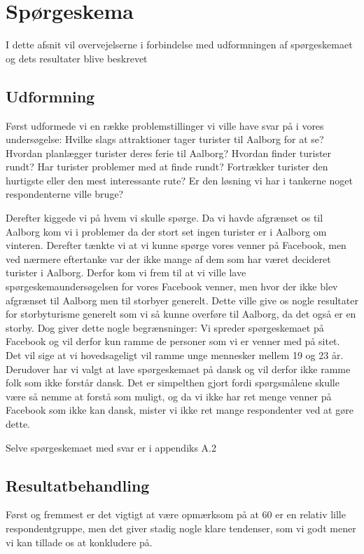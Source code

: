 \section{Spørgeskema}
I dette afsnit vil overvejelserne i forbindelse med udformningen af spørgeskemaet og dets resultater blive beskrevet

\subsection{Udformning}
Først udformede vi en række problemstillinger vi ville have svar på i vores undersøgelse:
Hvilke slags attraktioner tager turister til Aalborg for at se?
Hvordan planlægger turister deres ferie til Aalborg?
Hvordan finder turister rundt?
Har turister problemer med at finde rundt?
Fortrækker turister den hurtigste eller den mest interessante rute?
Er den løsning vi har i tankerne noget respondenterne ville bruge?

Derefter kiggede vi på hvem vi skulle spørge. Da vi havde afgrænset os til Aalborg kom vi i problemer da der stort set ingen turister er i Aalborg om vinteren. Derefter tænkte vi at vi kunne spørge vores venner på Facebook, men ved nærmere eftertanke var der ikke mange af dem som har været decideret turister i Aalborg. Derfor kom vi frem til at vi ville lave spørgeskemaundersøgelsen for vores Facebook venner, men hvor der ikke blev afgrænset til Aalborg men til storbyer generelt. Dette ville give os nogle resultater for storbyturisme generelt som vi så kunne overføre til Aalborg, da det også er en storby. Dog giver dette nogle begrænsninger: Vi spreder spørgeskemaet på Facebook og vil derfor kun ramme de personer som vi er venner med på sitet. Det vil sige at vi hovedsageligt vil ramme unge mennesker mellem 19 og 23 år. Derudover har vi valgt at lave spørgeskemaet på dansk og vil derfor ikke ramme folk som ikke forstår dansk. Det er simpelthen gjort fordi spørgsmålene skulle være så nemme at forstå som muligt, og da vi ikke har ret menge venner på Facebook som ikke kan dansk, mister vi ikke ret mange respondenter ved at gøre dette.

Selve spørgeskemaet med svar er i appendiks A.2

\subsection{Resultatbehandling}
Først og fremmest er det vigtigt at være opmærksom på at 60 er en relativ lille respondentgruppe, men det giver stadig nogle klare tendenser, som vi godt mener vi kan tillade os at konkludere på.

